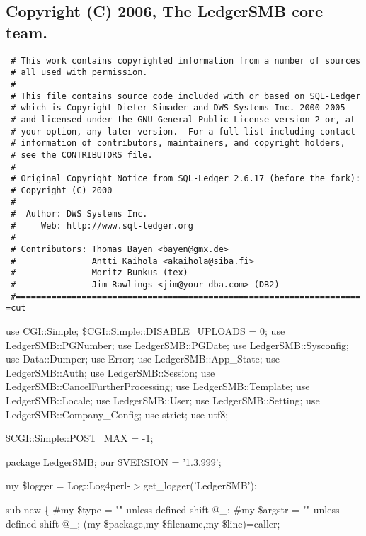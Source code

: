 \subsection*{Copyright (C) 2006, The LedgerSMB core team.\label{LedgerSMB_Copyright_C_2006_The_LedgerSMB_core_team_}}
\begin{verbatim}
 # This work contains copyrighted information from a number of sources 
 # all used with permission.
 #
 # This file contains source code included with or based on SQL-Ledger
 # which is Copyright Dieter Simader and DWS Systems Inc. 2000-2005
 # and licensed under the GNU General Public License version 2 or, at
 # your option, any later version.  For a full list including contact
 # information of contributors, maintainers, and copyright holders, 
 # see the CONTRIBUTORS file.
 #
 # Original Copyright Notice from SQL-Ledger 2.6.17 (before the fork):
 # Copyright (C) 2000
 #
 #  Author: DWS Systems Inc.
 #     Web: http://www.sql-ledger.org
 #
 # Contributors: Thomas Bayen <bayen@gmx.de>
 #               Antti Kaihola <akaihola@siba.fi>
 #               Moritz Bunkus (tex)
 #               Jim Rawlings <jim@your-dba.com> (DB2)
 #====================================================================
=cut
\end{verbatim}


use CGI::Simple;
\$CGI::Simple::DISABLE\_UPLOADS = 0;
use LedgerSMB::PGNumber;
use LedgerSMB::PGDate;
use LedgerSMB::Sysconfig;
use Data::Dumper;
use Error;
use LedgerSMB::App\_State;
use LedgerSMB::Auth;
use LedgerSMB::Session;
use LedgerSMB::CancelFurtherProcessing;
use LedgerSMB::Template;
use LedgerSMB::Locale;
use LedgerSMB::User;
use LedgerSMB::Setting;
use LedgerSMB::Company\_Config;
use strict;
use utf8;



\$CGI::Simple::POST\_MAX = -1;



package LedgerSMB;
our \$VERSION = '1.3.999';



my \$logger = Log::Log4perl-$>$get\_logger('LedgerSMB');



sub new \{
    \#my \$type   = "" unless defined shift @\_;
    \#my \$argstr = "" unless defined shift @\_;
    (my \$package,my \$filename,my \$line)=caller;

